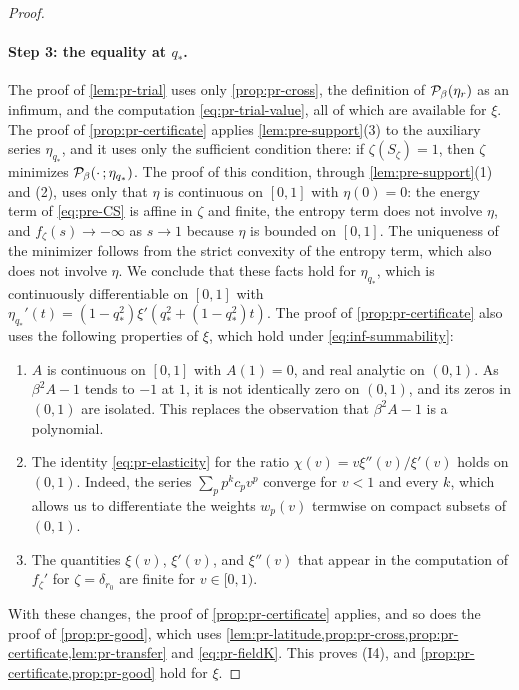 \begin{proof}
\paragraph{Step 3: the equality at $q_*$.} The proof of \cref{lem:pr-trial} uses only \cref{prop:pr-cross}, the definition of $\mathcal P_\beta(\eta_r)$ as an infimum, and the computation \eqref{eq:pr-trial-value}, all of which are available for $\xi$. The proof of \cref{prop:pr-certificate} applies \cref{lem:pre-support}(3) to the auxiliary series $\eta_{q_*}$, and it uses only the sufficient condition there: if $\zeta(S_\zeta)=1$, then $\zeta$ minimizes $\mathcal P_\beta(\cdot\,;\eta_{q_*})$. The proof of this condition, through \cref{lem:pre-support}(1) and (2), uses only that $\eta$ is continuous on $[0,1]$ with $\eta(0)=0$: the energy term of \eqref{eq:pre-CS} is affine in $\zeta$ and finite, the entropy term does not involve $\eta$, and $f_\zeta(s)\to-\infty$ as $s\to1$ because $\eta$ is bounded on $[0,1]$. The uniqueness of the minimizer follows from the strict convexity of the entropy term, which also does not involve $\eta$. We conclude that these facts hold for $\eta_{q_*}$, which is continuously differentiable on $[0,1]$ with $\eta_{q_*}'(t)=(1-q_*^2)\xi'(q_*^2+(1-q_*^2)t)$. The proof of \cref{prop:pr-certificate} also uses the following properties of $\xi$, which hold under \eqref{eq:inf-summability}:
\begin{enumerate}
\item[(a)] $A$ is continuous on $[0,1]$ with $A(1)=0$, and real analytic on $(0,1)$. As $\beta^2A-1$ tends to $-1$ at $1$, it is not identically zero on $(0,1)$, and its zeros in $(0,1)$ are isolated. This replaces the observation that $\beta^2A-1$ is a polynomial.
\item[(b)] The identity \eqref{eq:pr-elasticity} for the ratio $\chi(v)=v\xi''(v)/\xi'(v)$ holds on $(0,1)$. Indeed, the series $\sum_pp^kc_pv^p$ converge for $v<1$ and every $k$, which allows us to differentiate the weights $w_p(v)$ termwise on compact subsets of $(0,1)$.
\item[(c)] The quantities $\xi(v)$, $\xi'(v)$, and $\xi''(v)$ that appear in the computation of $f_\zeta'$ for $\zeta=\delta_{r_0}$ are finite for $v\in[0,1)$.
\end{enumerate}
With these changes, the proof of \cref{prop:pr-certificate} applies, and so does the proof of \cref{prop:pr-good}, which uses \cref{lem:pr-latitude,prop:pr-cross,prop:pr-certificate,lem:pr-transfer} and \eqref{eq:pr-fieldK}. This proves (I4), and \cref{prop:pr-certificate,prop:pr-good} hold for $\xi$.

\end{proof}

